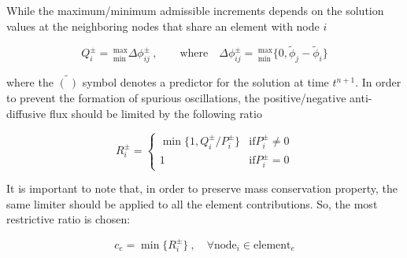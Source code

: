 While the maximum/minimum admissible increments depends on the solution values at the neighboring nodes that share an element with node $i$

\begin{equation} \label{admissible_increment}
Q_i^\pm =\, _{\min}^{\max}\Delta \phi_{ij}^\pm \ , \qquad
\text{where} \quad \Delta \phi_{ij}^\pm =\, _{\min}^{\max}
\{0, \tilde{\phi}_j - \tilde{\phi}_i\}
\end{equation}

where the $\tilde{(\ )}$ symbol denotes a predictor for the solution at time $t^{n+1}$. In order to prevent the formation of spurious oscillations, the positive/negative anti-diffusive flux should be limited by the following ratio

\begin{equation}
R_i^\pm = \begin{cases}
    \min\{1, Q_i^\pm / P_i^\pm\} & \text{if} P_i^\pm \neq 0 \\
    1 & \text{if} P_i^\pm = 0
\end{cases}
\end{equation}

It is important to note that, in order to preserve mass conservation property, the same limiter should be applied to all the element contributions. So, the most restrictive ratio is chosen:

\begin{equation}
c_e = \min\{R_i^\pm\}\ , \quad \forall \text{node}_i \in \text{element}_e
\end{equation}



